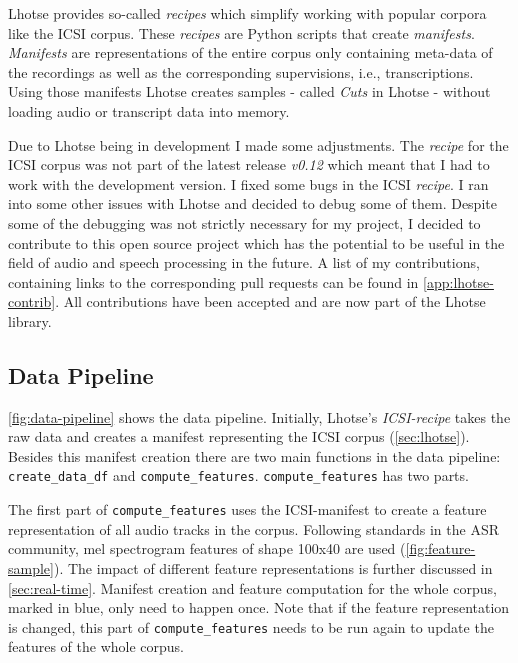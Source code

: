 \documentclass[bsc,frontabs,parskip,deptreport]{infthesis}
\begin{document}
Lhotse provides so-called \textit{recipes} which simplify working with popular corpora like the ICSI corpus.
These \textit{recipes} are Python scripts that create \textit{manifests}.
\textit{Manifests} are representations of the entire corpus only containing meta-data of the recordings as well as the corresponding supervisions, i.e., transcriptions.
Using those manifests Lhotse creates samples - called \textit{Cuts} in Lhotse - without loading audio or transcript data into memory. 

Due to Lhotse being in development I made some adjustments. The \textit{recipe} for the ICSI corpus was not part of the latest release \textit{v0.12} which meant that I had to work with the development version. 
I fixed some bugs in the ICSI \textit{recipe}. 
I ran into some other issues with Lhotse and decided to debug some of them. Despite some of the debugging was not strictly necessary for my project, I decided to contribute to this open source project which has the potential to be useful in the field of audio and speech processing in the future. A list of my contributions, containing links to the corresponding pull requests can be found in \autoref{app:lhotse-contrib}. All contributions have been accepted and are now part of the Lhotse library.

\subsection{Data Pipeline} \label{sec:ml-data-pipeline}

\autoref{fig:data-pipeline} shows the data pipeline.
Initially, Lhotse's \textit{ICSI-recipe} takes the raw data and creates a manifest representing the ICSI corpus (\autoref{sec:lhotse}).
Besides this manifest creation there are two main functions in the data pipeline: \verb|create_data_df| and \verb|compute_features|. 
\verb|compute_features| has two parts.

The first part of \verb|compute_features| uses the ICSI-manifest to create a feature representation of all audio tracks in the corpus. Following standards in the ASR community, mel spectrogram features of shape 100x40 are used (\autoref{fig:feature-sample}). The impact of different feature representations is further discussed in \autoref{sec:real-time}. 
Manifest creation and feature computation for the whole corpus, marked in blue, only need to happen once.
Note that if the feature representation is changed, this part of \verb|compute_features| needs to be run again to update the features of the whole corpus.
\end{document}
